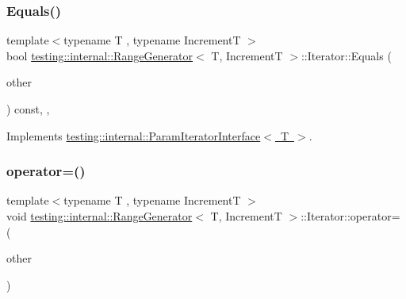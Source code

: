 \subsubsection{\texorpdfstring{Equals()}{Equals()}\hspace{0.1cm}{\footnotesize\ttfamily [3/3]}}
{\footnotesize\ttfamily template$<$typename T , typename IncrementT $>$ \\
bool \mbox{\hyperlink{classtesting_1_1internal_1_1_range_generator}{testing\+::internal\+::\+Range\+Generator}}$<$ T, IncrementT $>$\+::Iterator\+::\+Equals (\begin{DoxyParamCaption}\item[{const \mbox{\hyperlink{classtesting_1_1internal_1_1_param_iterator_interface}{Param\+Iterator\+Interface}}$<$ T $>$ \&}]{other }\end{DoxyParamCaption}) const\hspace{0.3cm}{\ttfamily [inline]}, {\ttfamily [override]}, {\ttfamily [virtual]}}



Implements \mbox{\hyperlink{classtesting_1_1internal_1_1_param_iterator_interface_a9d811697a752d46f7bd6a0082f9040a3}{testing\+::internal\+::\+Param\+Iterator\+Interface$<$ T $>$}}.

\mbox{\label{classtesting_1_1internal_1_1_range_generator_1_1_iterator_acd95aafca4a92db473dd4a88bbc9ab1b}} 
\subsubsection{\texorpdfstring{operator=()}{operator=()}\hspace{0.1cm}{\footnotesize\ttfamily [1/3]}}
{\footnotesize\ttfamily template$<$typename T , typename IncrementT $>$ \\
void \mbox{\hyperlink{classtesting_1_1internal_1_1_range_generator}{testing\+::internal\+::\+Range\+Generator}}$<$ T, IncrementT $>$\+::Iterator\+::operator= (\begin{DoxyParamCaption}\item[{const \mbox{\hyperlink{classtesting_1_1internal_1_1_range_generator_1_1_iterator}{Iterator}} \&}]{other }\end{DoxyParamCaption})\hspace{0.3cm}{\ttfamily [private]}}

